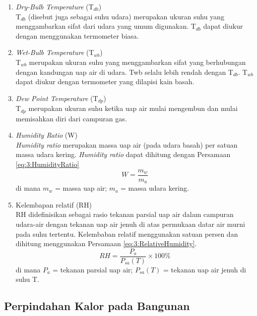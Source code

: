 \begin{enumerate}
	\item \textit{Dry-Bulb Temperature} (T$_{db}$) \\
	T$_{db}$ (disebut juga sebagai suhu udara) merupakan ukuran suhu yang menggambarkan sifat dari udara yang umum digunakan. T$_{db}$ dapat diukur dengan menggunakan termometer biasa.
	
	\item \textit{Wet-Bulb Temperature} (T$_{wb}$) \\
	T$_{wb}$ merupakan ukuran suhu yang menggambarkan sifat yang berhubungan dengan kandungan uap air di udara. Twb selalu lebih rendah dengan T$_{db}$. T$_{wb}$ dapat diukur dengan termometer yang dilapisi kain basah.
	
	\item \textit{Dew Point Temperature} (T$_{dp}$) \\
	T$_{dp}$ merupakan ukuran suhu ketika uap air mulai mengembun dan mulai memisahkan diri dari campuran gas.
	
	\item \textit{Humidity Ratio} (W)\\
	\textit{Humidity ratio} merupakan massa uap air (pada udara basah) per satuan massa udara kering. \textit{Humidity ratio} dapat dihitung dengan Persamaan \ref{eq:3:HumidityRatio}\\
	\begin{equation} \label{eq:3:HumidityRatio}
		W = \frac{m_w}{m_a} 
	\end{equation}
	di mana $m_w$ = massa uap air; $m_a$ = massa udara kering.
	
	\item Kelembapan relatif (RH) \\
	RH didefinisikan sebagai rasio tekanan parsial uap air dalam campuran udara-air dengan tekanan uap air jenuh di atas permukaan datar air murni pada suhu tertentu. Kelembaban relatif menggunakan satuan persen dan dihitung menggunakan Persamaan \ref{eq:3:RelativeHumidity}.
	\begin{equation} \label{eq:3:RelativeHumidity}
	RH = \frac{P_a}{P_{sa}(T)} \times 100\% 
	\end{equation}
	di mana $P_a$ = tekanan parsial uap air; $P_{sa}(T)$ = tekanan uap air jenuh di suhu T.
\end{enumerate}

\subsection{Perpindahan Kalor pada Bangunan}

